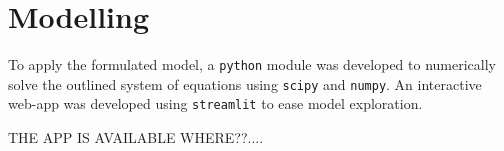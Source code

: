 \section{Modelling}

To apply the formulated model, a \texttt{python} module was developed to numerically solve the outlined system of equations using \texttt{scipy} and \texttt{numpy}. An interactive web-app was developed using \texttt{streamlit} to ease model exploration. 

\large THE APP IS AVAILABLE WHERE??....

